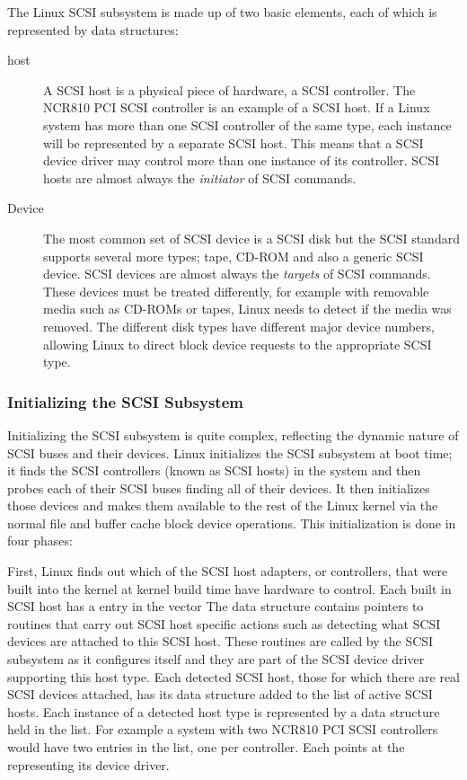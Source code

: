The Linux SCSI subsystem is made up of two basic elements, each of which is represented by
data structures:
\begin{description}
	\item [host] A SCSI host is a physical piece of hardware, a SCSI controller.
	The NCR810 PCI SCSI controller is an example of a SCSI host.
	If a Linux system has more than one SCSI controller of the same type, each instance
	will be represented by a separate SCSI host.
	This means that a SCSI device driver may control more than one instance of its controller.
	SCSI hosts are almost always the {\em initiator} of SCSI commands.

	\item [Device] The most common set of SCSI device is a SCSI disk but the SCSI standard supports
	several more types; tape, CD-ROM and also a generic SCSI device.
	SCSI devices are almost always the {\em targets} of SCSI commands.  These devices must be
	treated differently, for example with removable media such as CD-ROMs or tapes, Linux needs
	to detect if the media was removed.
	The different disk types have different major device numbers, allowing Linux to direct
	block device requests to the appropriate SCSI type.
\end{description}

\subsubsection{Initializing the SCSI Subsystem}
Initializing the SCSI subsystem is quite complex, reflecting the dynamic nature of SCSI buses and their
devices.
Linux initializes the SCSI subsystem at boot time; it finds the SCSI controllers (known as SCSI hosts) in the system 
and then probes each of their SCSI buses finding all of their devices.
It then initializes those devices and makes them available to the rest of the Linux kernel via the
normal file and buffer cache block device operations.
This initialization is done in four phases:

First, Linux finds out which of the SCSI host adapters, or controllers, that were built into the 
kernel at kernel build time have hardware to control.
Each built in SCSI host has a  
entry in the  vector
The  data structure contains pointers to routines that carry out SCSI host specific
actions such as detecting what SCSI devices are attached to this SCSI host.
These routines are called by the SCSI subsystem as it configures itself and they are part of the
SCSI device driver supporting this host type.
Each detected SCSI host, those for which there are real SCSI devices attached, has its
 data structure added to the  list of
active SCSI hosts.
Each instance of a detected host type is represented by a  data structure held in the
 list.
For example a  system with two NCR810 PCI SCSI controllers would have two  entries in the
list, one per controller.
Each  points at the  representing its device driver.

